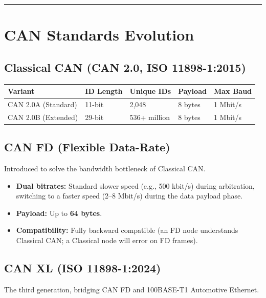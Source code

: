 \documentclass[12pt,a4paper,oneside]{report}
\providecommand{\tightlist}{\setlength{\itemsep}{0pt}\setlength{\parskip}{0pt}}
\begin{document}
\begin{center}\rule{0.5\linewidth}{0.5pt}\end{center}

\section{CAN Standards Evolution}\label{can-standards-evolution}

\subsection{Classical CAN (CAN 2.0, ISO
11898-1:2015)}\label{classical-can-can-2.0-iso-11898-12015}

\begin{longtable}[]{@{}lllll@{}}
\toprule\noalign{}
Variant & ID Length & Unique IDs & Payload & Max Baud \\
\midrule\noalign{}
\endhead
\bottomrule\noalign{}
\endlastfoot
CAN 2.0A (Standard) & 11-bit & 2,048 & 8 bytes & 1 Mbit/s \\
CAN 2.0B (Extended) & 29-bit & 536+ million & 8 bytes & 1 Mbit/s \\
\end{longtable}

\subsection{CAN FD (Flexible Data-Rate)}\label{can-fd-flexible-data-rate}

Introduced to solve the bandwidth bottleneck of Classical CAN.

\begin{itemize}
\tightlist
\item
  \textbf{Dual bitrates:} Standard slower speed (e.g., 500 kbit/s) during
  arbitration, switching to a faster speed (2--8 Mbit/s) during the data payload
  phase.
\item
  \textbf{Payload:} Up to \textbf{64 bytes}.
\item
  \textbf{Compatibility:} Fully backward compatible (an FD node understands
  Classical CAN; a Classical node will error on FD frames).
\end{itemize}

\subsection{CAN XL (ISO 11898-1:2024)}\label{can-xl-iso-11898-12024}

The third generation, bridging CAN FD and 100BASE-T1 Automotive Ethernet.
\end{document}
